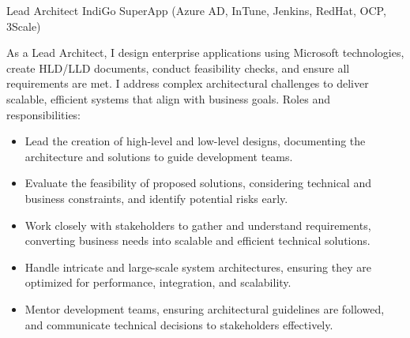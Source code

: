 

\begin{cventries}

\cventry
    {Lead Architect}
    {IndiGo SuperApp \tiny(Azure AD, InTune, Jenkins, RedHat, OCP, 3Scale)} %
    {} %
    {} %
    {
        As a Lead Architect, I design enterprise applications using Microsoft technologies, create HLD/LLD documents, conduct feasibility checks, and ensure all requirements are met. I address complex architectural challenges to deliver scalable, efficient systems that align with business goals.
        \newline Roles and responsibilities:
        \begin{itemize}
            \item Lead the creation of high-level and low-level designs, documenting the architecture and solutions to guide development teams.
            \item Evaluate the feasibility of proposed solutions, considering technical and business constraints, and identify potential risks early.
            \item Work closely with stakeholders to gather and understand requirements, converting business needs into scalable and efficient technical solutions.
            \item Handle intricate and large-scale system architectures, ensuring they are optimized for performance, integration, and scalability.
            \item Mentor development teams, ensuring architectural guidelines are followed, and communicate technical decisions to stakeholders effectively.
        \end{itemize}
    }


\end{cventries}
